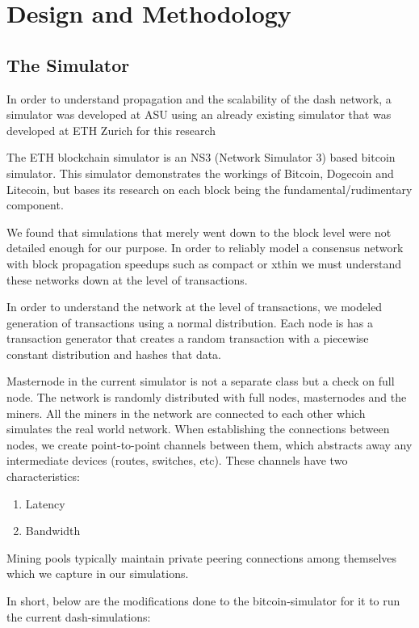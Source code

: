 \chapter{Design and Methodology}

\section{The Simulator}
In order to understand propagation and the scalability of the dash network, a
simulator was developed at ASU using an already existing simulator that was
developed at ETH Zurich for this research \citep{eth}
 
 The ETH blockchain simulator is an NS3 (Network Simulator 3) based bitcoin simulator. This
 simulator demonstrates the workings of Bitcoin, Dogecoin and Litecoin, but
 bases its research on each block being the fundamental/rudimentary component. 

 We found that simulations that merely went down to the block level were not
 detailed enough for our purpose. In order to reliably model a consensus
 network with block propagation speedups such as compact or xthin we must
 understand these networks down at the level of transactions.

 In order to understand the network at the level of transactions, we modeled
 generation of transactions using a normal
 distribution. Each node is has a transaction generator that creates a random
 transaction with a piecewise constant
 distribution and hashes that data.

 Masternode in the current simulator is not a separate class but a check on
 full node.  The network is randomly distributed with full nodes, masternodes
 and the miners. All the miners in the network are connected to each other
 which simulates the real world network.  When establishing the connections
 between nodes, we create point-to-point channels between them, which abstracts
 away any intermediate devices (routes, switches, etc). These channels have two
 characteristics: 

\begin{enumerate}
    \item Latency
    \item Bandwidth
\end{enumerate}

Mining pools typically maintain private peering connections among
themselves which we capture in our simulations. 

In short, below are the modifications done to the bitcoin-simulator for it to
run the current dash-simulations:


